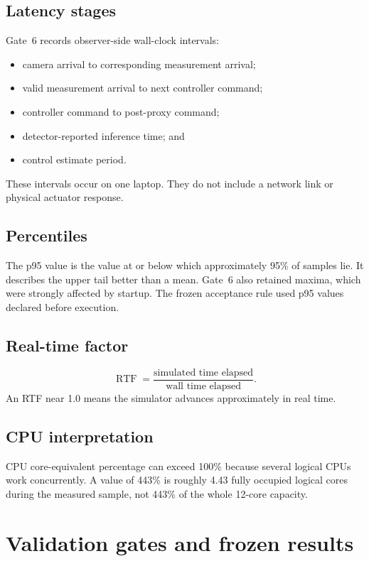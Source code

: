 \documentclass[11pt,oneside,openany]{book}
\begin{document}
\section{Latency stages}

Gate~6 records observer-side wall-clock intervals:
\begin{itemize}
  \item camera arrival to corresponding measurement arrival;
  \item valid measurement arrival to next controller command;
  \item controller command to post-proxy command;
  \item detector-reported inference time; and
  \item control estimate period.
\end{itemize}

These intervals occur on one laptop. They do not include a network link or physical actuator response.

\section{Percentiles}

The p95 value is the value at or below which approximately 95\% of samples lie. It describes the upper tail better than a mean. Gate~6 also retained maxima, which were strongly affected by startup. The frozen acceptance rule used p95 values declared before execution.

\section{Real-time factor}

\begin{equation}
\operatorname{RTF}=\frac{\text{simulated time elapsed}}{\text{wall time elapsed}}.
\end{equation}
An RTF near 1.0 means the simulator advances approximately in real time.

\section{CPU interpretation}

CPU core-equivalent percentage can exceed 100\% because several logical CPUs work concurrently. A value of 443\% is roughly 4.43 fully occupied logical cores during the measured sample, not 443\% of the whole 12-core capacity.

\chapter{Validation gates and frozen results}
\end{document}
